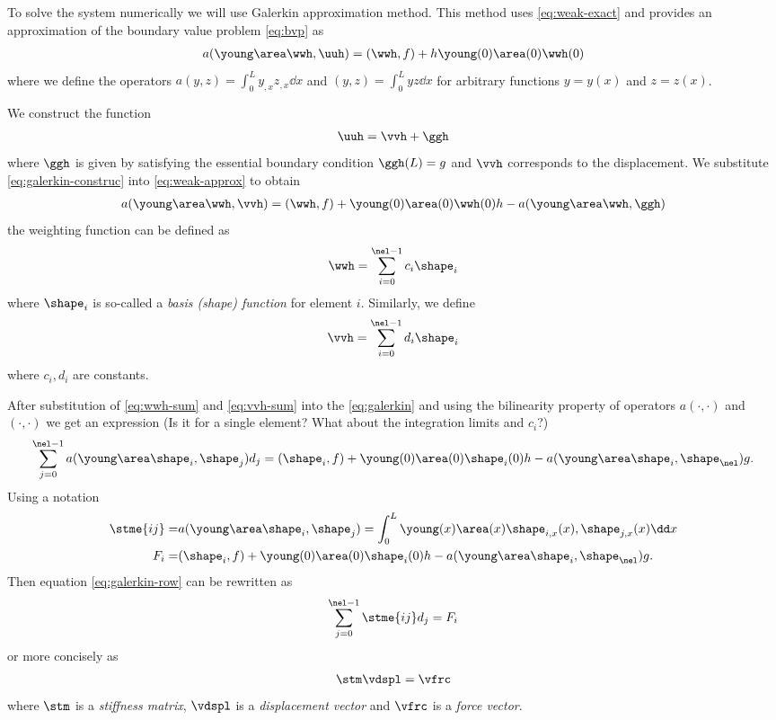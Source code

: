 \documentclass[twoside,a4paper,12pt]{article}
\newcommand{\note}[1]{{\color{red}\newline(#1)}}
\newcommand{\+}[2]{\newcommand#1{{\color{\notcolor}#2}}}
\newcommand{\1}[2]{\newcommand{#1}[1]{{\color{\notcolor}#2}}}
\newcommand{\2}[2]{\newcommand{#1}[2]{{\color{\notcolor}#2}}}
\begin{document}
To solve the system numerically we will use Galerkin approximation
method. This method uses \eqref{eq:weak-exact} and provides an
approximation of the boundary value problem \eqref{eq:bvp} as
%
\begin{align}
a(\young\area\wwh,\uuh) = (\wwh,f) + h \young(0)\area(0)\wwh(0) \label{eq:weak-approx}
\end{align}
%
where we define the operators $a(y,z) = \int_0^L y_{,x} z_{,x} \dd x$
and $(y,z) = \int_0^L y z \dd x$ for arbitrary functions $y = y(x)$
and $z= z(x)$.

We construct the function
\begin{align}
  \uuh  = \vvh + \ggh \label{eq:galerkin-construc}
\end{align}
%
where $\ggh$ is given by satisfying the essential boundary condition
$\ggh(L) = g$ and $\vvh$ corresponds to the displacement. We
substitute \eqref{eq:galerkin-construc} into \eqref{eq:weak-approx} to
obtain
%
\begin{align}
  a(\young\area\wwh,\vvh) = (\wwh, f) + \young(0)\area(0)\wwh(0)h - 
  a(\young\area\wwh,\ggh)\label{eq:galerkin}
\end{align}
%
the weighting function can be defined as
%
\begin{align}
  \wwh = \sum_{i=0}^{\nel-1} c_i \shape_i \label{eq:wwh-sum}
\end{align}
%
where $\shape_i$ is so-called a \emph{basis (shape) function} for
element $i$. Similarly, we define
%
\begin{align}
  \vvh = \sum_{i=0}^{\nel-1} d_i \shape_i \label{eq:vvh-sum}
\end{align}
where $c_i, d_i$ are constants.

After substitution of \eqref{eq:wwh-sum} and \eqref{eq:vvh-sum} into
the \eqref{eq:galerkin} and using the bilinearity property of
operators $a(\cdot,\cdot)$ and $(\cdot,\cdot)$ we get an expression
%
\note{Is it for a single element? What about the integration limits
  and $c_i$?}
%
\begin{align}
  \sum_{j=0}^{\nel-1} a(\young\area\shape_i, \shape_j) d_j = (\shape_i, f) + \young(0)\area(0)\shape_i(0) h - a(\young\area\shape_i,\shape_\nel)g. \label{eq:galerkin-row}
\end{align}
%
Using a notation
%
\begin{align}
  \stme{ij} =& a(\young\area\shape_i,\shape_j) = \int_0^L \young(x)\area(x)\shape_{i,x}(x),\shape_{j,x}(x) \dd x \\
  F_i =& (\shape_i,f) + \young(0)\area(0)\shape_i(0) h - a(\young\area\shape_i,\shape_{\nel}) g .
\end{align}
Then equation \eqref{eq:galerkin-row} can be rewritten as
%
\begin{align}
  \sum_{j=0}^{\nel-1} \stme{ij} d_j = F_i
\end{align}
or more concisely as
\begin{align}
\stm \vdspl = \vfrc
\end{align}
where $\stm$ is a \emph{stiffness matrix}, $\vdspl$ is a
\emph{displacement vector} and $\vfrc$ is a \emph{force vector}.
\end{document}
